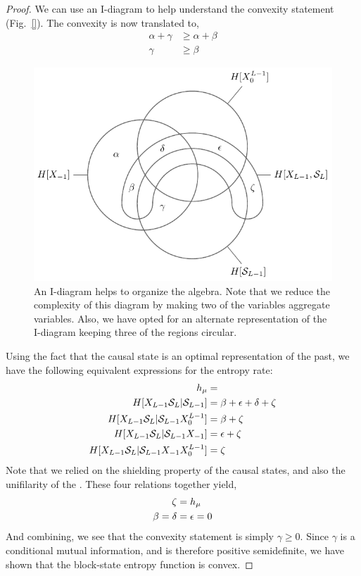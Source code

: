 \begin{proof}
We can use an I-diagram to help understand the convexity statement (Fig.~\ref{}). The convexity is now translated to,
\begin{align*}
\alpha + \gamma &\ge \alpha + \beta\\
\gamma &\ge \beta
\end{align*}
\begin{figure}[h!]
\centering
\includegraphics[scale=1.0]{../chapter3/figures/tikz/4var_snake}
\caption{An I-diagram helps to organize the algebra. Note that we reduce the complexity of this diagram by making two of the variables aggregate variables. Also, we have opted for an alternate representation of the I-diagram keeping three of the regions circular.}
\label{fig:4var_snake}
\end{figure}
Using the fact that the causal state is an optimal representation of the past, we have the following equivalent expressions for the entropy rate:
\begin{align*}
h_\mu &= \\
H[{X}_{L-1} \mathcal{S}_L | \mathcal{S}_{L-1}]&= \beta + \epsilon + \delta + \zeta\\
H[{X}_{L-1} \mathcal{S}_L | \mathcal{S}_{L-1} {X}_0^{L-1}]&= \beta + \zeta\\
H[{X}_{L-1} \mathcal{S}_L | \mathcal{S}_{L-1} {X}_{-1}]&= \epsilon + \zeta \\
H[{X}_{L-1} \mathcal{S}_L | \mathcal{S}_{L-1} {X}_{-1} {X}_0^{L-1}]&= \zeta \\
\end{align*}
Note that we relied on the shielding property of the causal states, and also the unifilarity of the \eM. These four relations together yield,
\begin{align*}
\zeta&=h_\mu\\
\beta = \delta &= \epsilon = 0
\end{align*}
And combining, we see that the convexity statement is simply $\gamma \ge 0$. Since $\gamma$ is a conditional mutual information, and is therefore positive semidefinite, we have shown that the block-state entropy function is convex.
\end{proof}

